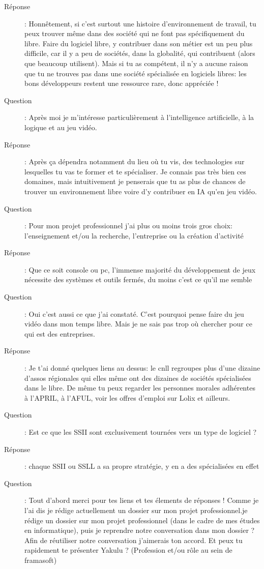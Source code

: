 \documentclass[a4paper,12pt, draft]{report}
\begin{document}
\begin{description}
\item [Réponse]:  Honnêtement, si c'est surtout une histoire d'environnement de travail, tu peux trouver même dans des société qui ne font pas spécifiquement du libre. Faire du logiciel libre, y contribuer dans son métier est un peu plus difficile, car il y a peu de sociétés, dans la globalité, qui contribuent (alors que beaucoup utilisent). Mais si tu as compétent, il n'y a aucune raison que tu ne trouves pas dans une société spécialisée en logiciels libres: les bons développeurs restent une ressource rare, donc appréciée !
\item [Question]:  Après moi je m'intéresse particulièrement à l'intelligence artificielle, à la logique et au jeu vidéo.
\item [Réponse]:  Après ça dépendra notamment du lieu où tu vis, des technologies sur lesquelles tu vas te former et te spécialiser. Je connais pas très bien ces domaines, mais intuitivement je penserais que tu as plus de chances de trouver un environnement libre voire d'y contribuer en IA qu'en jeu vidéo.
\item [Question]:  Pour mon projet professionnel j'ai plus ou moins trois gros choix: l'enseignement et/ou la recherche, l'entreprise ou la création d'activité 
\item [Réponse]:  Que ce soit console ou pc, l'immense majorité du développement de jeux nécessite des systèmes et outils fermés, du moins c'est ce qu'il me semble
\item [Question]:  Oui c'est aussi ce que j'ai constaté. C'est pourquoi pense faire du jeu vidéo dans mon temps libre. Mais je ne sais pas trop où chercher pour ce qui est des entreprises.
\item [Réponse]:  Je t'ai donné quelques liens au dessus: le cnll regroupes plus d'une dizaine d'assos régionales qui elles même ont des dizaines de sociétés spécialisées dans le libre. De même tu peux regarder les personnes morales adhérentes à l'APRIL, à l'AFUL, voir les offres d'emploi sur Lolix et ailleurs.

\item [Question]:  Est ce que les SSII sont exclusivement tournées vers un type de logiciel ?
\item [Réponse]:  chaque SSII ou SSLL a sa propre stratégie, y en a des spécialisées en effet
\item [Question]: Tout d'abord merci pour tes liens et tes élements de réponses ! Comme je l'ai dis je rédige actuellement un dossier sur mon projet professionnel.je rédige un dossier sur mon projet professionnel (dans le cadre de mes études en informatique), puis je reprendre notre conversation dans mon dossier ?  Afin de réutiliser notre conversation j'aimerais ton accord. Et peux tu rapidement te présenter Yakulu ? (Profession et/ou rôle au sein de framasoft)


\end{description}
\end{document}
